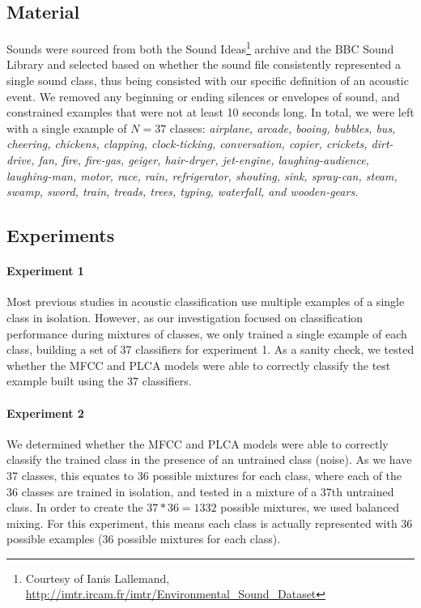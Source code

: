 \documentclass[a4paper,10pt,final]{ThesisStyle}
\begin{document}
\subsection{Material}
Sounds were sourced from both the Sound Ideas\footnote{Courtesy of Ianis Lallemand, \url{http://imtr.ircam.fr/imtr/Environmental\_Sound\_Dataset}} archive and the BBC Sound Library and selected based on whether the sound file consistently represented a single sound class, thus being consisted with our specific definition of an acoustic event.  We removed any beginning or ending silences or envelopes of sound, and constrained examples that were not at least 10 seconds long.  In total, we were left with a single example of $N = 37$ classes: \textit{airplane, arcade, booing, bubbles, bus, cheering, chickens, clapping, clock-ticking, conversation, copier, crickets, dirt-drive, fan, fire, fire-gas, geiger, hair-dryer, jet-engine, laughing-audience, laughing-man, motor, race, rain, refrigerator, shouting, sink, spray-can, steam, swamp, sword, train, treads, trees, typing, waterfall, and wooden-gears}.  



\subsection{Experiments}

\paragraph{Experiment 1}
Most previous studies in acoustic classification use multiple examples of a single class in isolation.  However, as our investigation focused on classification performance during mixtures of classes, we only trained a single example of each class, building a set of 37 classifiers for experiment 1.  As a sanity check, we tested whether the MFCC and PLCA models were able to correctly classify the test example built using the 37 classifiers.

\paragraph{Experiment 2}
We determined whether the MFCC and PLCA models were able to correctly classify the trained class in the presence of an untrained class (noise).  As we have 37 classes, this equates to 36 possible mixtures for each class, where each of the 36 classes are trained in isolation, and tested in a mixture of a 37th untrained class.  In order to create the $37*36 = 1332$ possible mixtures, we used balanced mixing.  For this experiment, this means each class is actually represented with 36 possible examples (36 possible mixtures for each class).  
\end{document}
